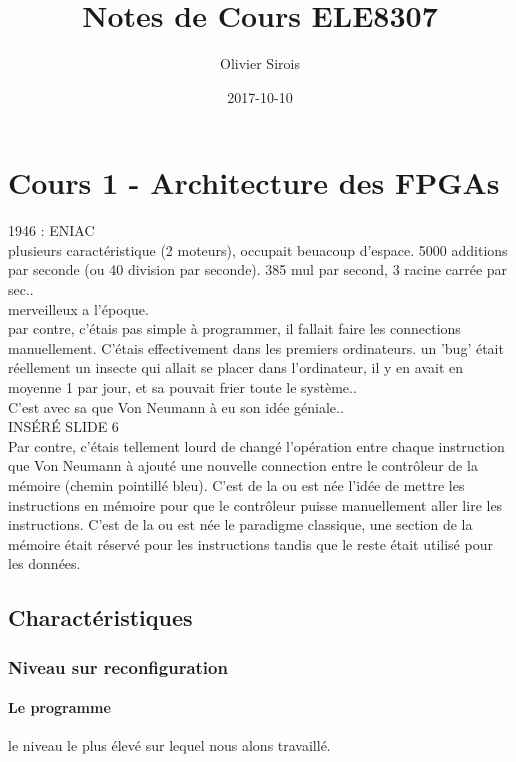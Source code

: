\documentclass[oneside]{book}
\title{Notes de Cours ELE8307}
\date{2017-10-10}
\author{Olivier Sirois}
\begin{document}
    \setcounter{page}{1}
    \maketitle
    \tableofcontents
    
        
    \chapter{Cours 1 - Architecture des FPGAs}
        1946 : ENIAC\\
        plusieurs caractéristique (2 moteurs), occupait beuacoup d'espace. 5000 additions par seconde (ou 40 division par seconde). 385 mul par second, 3 racine carrée par sec..\\
        
        merveilleux a l'époque.\\
        
        par contre, c'étais pas simple à programmer, il fallait faire les connections manuellement. C'étais effectivement dans les premiers ordinateurs. un 'bug' était réellement un insecte qui allait se placer dans l'ordinateur, il y en avait en moyenne 1 par jour, et sa pouvait frier toute le système..\\
        
        C'est avec sa que Von Neumann à eu son idée géniale..\\
        
        INSÉRÉ SLIDE 6\\
        
        Par contre, c'étais tellement lourd de changé l'opération entre chaque instruction que Von Neumann à ajouté une nouvelle connection entre le contrôleur de la mémoire (chemin pointillé bleu). C'est de la ou est née l'idée de mettre les instructions en mémoire pour que le contrôleur puisse manuellement aller lire les instructions. C'est de la ou est née le paradigme classique, une section de la mémoire était réservé pour les instructions tandis que le reste était utilisé pour les données.
        \section{Charactéristiques}
        \subsection{Niveau sur reconfiguration}
        \subsubsection{Le programme}
        le niveau le plus élevé sur lequel nous alons travaillé. 
\end{document}
